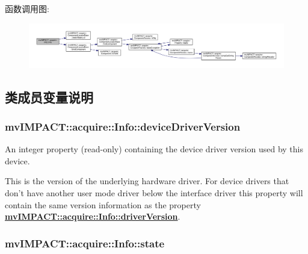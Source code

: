 函数调用图\+:
\nopagebreak
\begin{figure}[H]
\begin{center}
\leavevmode
\includegraphics[width=350pt]{classmv_i_m_p_a_c_t_1_1acquire_1_1_info_acd283bf5ade401d68a7ea075432e32a4_cgraph}
\end{center}
\end{figure}




\subsection{类成员变量说明}
\hypertarget{classmv_i_m_p_a_c_t_1_1acquire_1_1_info_ac8609c004dae3b7462be59a8d88f6b26}{
\subsubsection[{device\+Driver\+Version}]{ mv\+I\+M\+P\+A\+C\+T\+::acquire\+::\+Info\+::device\+Driver\+Version}}\label{classmv_i_m_p_a_c_t_1_1acquire_1_1_info_ac8609c004dae3b7462be59a8d88f6b26}


An integer property {\bfseries }(read-\/only) containing the device driver version used by this device. 

This is the version of the underlying hardware driver. For device drivers that don't have another user mode driver below the interface driver this property will contain the same version information as the property {\bfseries \hyperlink{classmv_i_m_p_a_c_t_1_1acquire_1_1_info_a19ab962a85d1498b33691782dd9be0f1}{mv\+I\+M\+P\+A\+C\+T\+::acquire\+::\+Info\+::driver\+Version}}. \hypertarget{classmv_i_m_p_a_c_t_1_1acquire_1_1_info_a90163f7be08608c332cec95faf55c93b}{
\subsubsection[{state}]{ mv\+I\+M\+P\+A\+C\+T\+::acquire\+::\+Info\+::state}}\label{classmv_i_m_p_a_c_t_1_1acquire_1_1_info_a90163f7be08608c332cec95faf55c93b}


